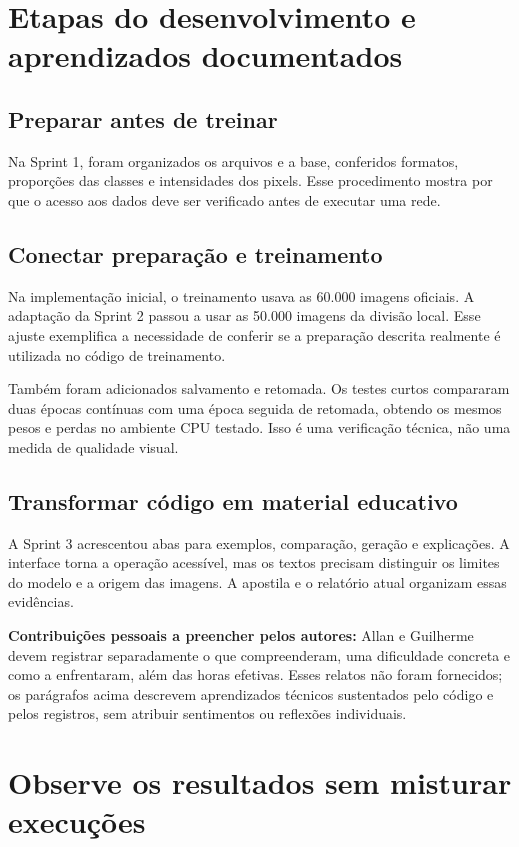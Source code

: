 \documentclass[12pt,a4paper]{article}
\begin{document}
\section{Etapas do desenvolvimento e aprendizados documentados}
\subsection{Preparar antes de treinar}
Na Sprint 1, foram organizados os arquivos e a base, conferidos formatos, proporções das classes e intensidades dos pixels. Esse procedimento mostra por que o acesso aos dados deve ser verificado antes de executar uma rede.

\subsection{Conectar preparação e treinamento}
Na implementação inicial, o treinamento usava as 60.000 imagens oficiais. A adaptação da Sprint 2 passou a usar as 50.000 imagens da divisão local. Esse ajuste exemplifica a necessidade de conferir se a preparação descrita realmente é utilizada no código de treinamento.

Também foram adicionados salvamento e retomada. Os testes curtos compararam duas épocas contínuas com uma época seguida de retomada, obtendo os mesmos pesos e perdas no ambiente CPU testado. Isso é uma verificação técnica, não uma medida de qualidade visual.

\subsection{Transformar código em material educativo}
A Sprint 3 acrescentou abas para exemplos, comparação, geração e explicações. A interface torna a operação acessível, mas os textos precisam distinguir os limites do modelo e a origem das imagens. A apostila e o relatório atual organizam essas evidências.

\textbf{Contribuições pessoais a preencher pelos autores:} Allan e Guilherme devem registrar separadamente o que compreenderam, uma dificuldade concreta e como a enfrentaram, além das horas efetivas. Esses relatos não foram fornecidos; os parágrafos acima descrevem aprendizados técnicos sustentados pelo código e pelos registros, sem atribuir sentimentos ou reflexões individuais.

\section{Observe os resultados sem misturar execuções}
\end{document}
